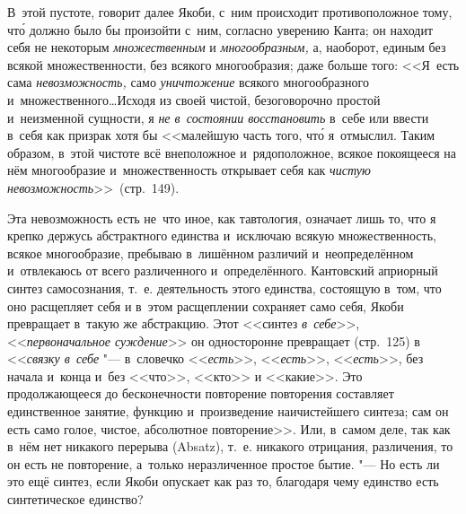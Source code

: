 В~этой пустоте, говорит далее Якоби, с~ним происходит противоположное тому,
чт\'{о} должно было бы произойти с~ним, согласно уверению Канта; он находит
себя не некоторым {\em множественным} и {\em многообразным,} а, наоборот,
единым без всякой множественности, без всякого многообразия; даже больше того:
<<Я~есть сама {\em невозможность,} само {\em уничтожение} всякого
многообразного и~множественного\ldots Исходя из своей чистой, безоговорочно
простой и~неизменной сущности, я {\em не в~состоянии восстановить} в~себе или
ввести в~себя как призрак хотя бы <<малейшую часть того, чт\'{о} я~отмыслил.
Таким образом, в~этой чистоте всё внеположное и~рядоположное, всякое покоящееся
на нём многообразие и~множественность открывает себя как
{\em чистую невозможность}>>~(стр.~149).

Эта невозможность есть не~что иное, как тавтология, означает лишь то, что я
крепко держусь абстрактного единства и~исключаю всякую множественность, всякое
многообразие, пребываю в~лишённом различий и~неопределённом и~отвлекаюсь от
всего различенного и~определённого. Кантовский априорный синтез самосознания,
т.~е. деятельность этого единства, состоящую в~том, что оно расщепляет себя и
в~этом расщеплении сохраняет само себя, Якоби превращает в~такую же абстракцию.
Этот <<синтез {\em в~себе}>>, <<{\em первоначальное суждение}>> он односторонне
превращает (стр.~125) в <<{\em связку в~себе} "--- в~словечко <<{\em есть}>>,
<<{\em есть}>>, <<{\em есть}>>, без начала и~конца и~без <<что>>, <<кто>> и
<<какие>>. Это продолжающееся до бесконечности повторение повторения составляет
единственное занятие, функцию и~произведение наичистейшего синтеза; сам он есть
само голое, чистое, абсолютное повторение>>. Или, в~самом деле, так как в~нём
нет никакого перерыва (Ab\-satz), т.~е. никакого отрицания, различения, то он есть не
повторение, а~только неразличенное простое бытие. "--- Но есть ли это ещё
синтез, если Якоби опускает как раз то, благодаря чему единство есть
синтетическое единство?

